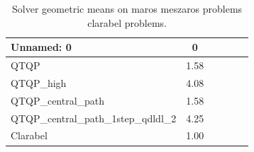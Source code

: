 \begin{table}
\caption{Solver geometric means on maros meszaros problems clarabel problems.}
\label{t-maros meszaros problems clarabel-geom_mean}
\begin{tabular}{lccccc}
\toprule
Unnamed: 0 & 0 \\
\midrule
QTQP & 1.58 \\
QTQP_high & 4.08 \\
QTQP_central_path & 1.58 \\
QTQP_central_path_1step_qdldl_2 & 4.25 \\
Clarabel & 1.00 \\
\bottomrule
\end{tabular}
\end{table}
